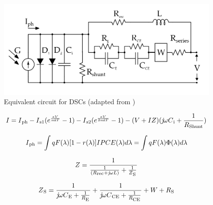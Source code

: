 { \begin{figure}[H]
  \begin{center}
	\includegraphics[width=1.0\linewidth]{images/dsc_eq_ckt}
	\caption{Equivalent circuit for DSCs (adapted from \cite{yong2008modeling})  }
	\label{fig:dsc_eq_ckt}
  \end{center}
  \end{figure}

 \begin{equation}
  \begin{aligned}
    I = I\textsubscript{ph} -  I\textsubscript{s1} (e^{\frac{eV}{\textit{mk}T}}-1) - I\textsubscript{s2} (e^{\frac{eV}{2\textit{mk}T}}-1)- (V+IZ)(\textit{j}{\omega}C\textsubscript{i}+\frac{1}{R\textsubscript{Shunt}}) 
     \label{eq:equ_current_dSC}
  \end{aligned}
 \end{equation}
    
 \begin{equation}
  \begin{aligned}
     I\textsubscript{ph} =\int{qF(\lambda)[1-r(\lambda)]IPCE(\lambda)d\lambda} = \int{qF(\lambda)\Phi(\lambda)d\lambda}  
  \end{aligned}
 \end{equation}
 
  \begin{equation}
   \begin{aligned}
     Z={\dfrac{1}{{\frac{1}{(R\textsubscript{rec}+\textit{j}{\omega}L)}}+{\frac{1}{Z\textsubscript{S}}}}} 
   \end{aligned}
  \end{equation}
  
 \begin{equation}
   \begin{aligned}
    Z\textsubscript{S}={\dfrac{1}{{\textit{j}{\omega}C\textsubscript{E}}+{\frac{1}{R\textsubscript{E}}}}}+{\dfrac{1}{{\textit{j}{\omega}C\textsubscript{CE}}+{\frac{1}{R\textsubscript{CE}}}}}+W+R\textsubscript{S}
   \end{aligned}
  \end{equation}
  
}

